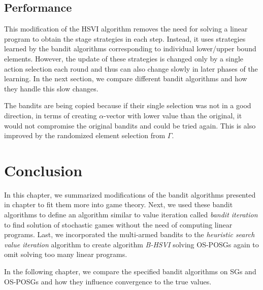 \documentclass[../main.tex]{subfiles}
\begin{document}
\subsection{Performance}
This modification of the HSVI algorithm removes the need for solving a linear program to obtain the stage strategies in each step.
Instead, it uses strategies learned by the bandit algorithms corresponding to individual lower/upper bound elements.
However, the update of these strategies is changed only by a single action selection each round and thus can also change slowly in later phases of the learning.
In the next section, we compare different bandit algorithms and how they handle this slow changes.

The bandits are being copied because if their single selection was not in a good direction, in terms of creating $\alpha$-vector with lower value than the original, it would not compromise the original bandits and could be tried again.
This is also improved by the randomized element selection from $\Gamma$.

\section{Conclusion}
In this chapter, we summarized modifications of the bandit algorithms presented in chapter  to fit them more into game theory.
Next, we used these bandit algorithms to define an algorithm similar to value iteration called \textit{bandit iteration} to find solution of stochastic games without the need of computing linear programs.
Last, we incorporated the multi-armed bandits to the \textit{heuristic search value iteration} algorithm to create algorithm \textit{B-HSVI} solving OS-POSGs again to omit solving too many linear programs.

In the following chapter, we compare the specified bandit algorithms on SGs and OS-POSGs and how they influence convergence to the true values.
\end{document}
